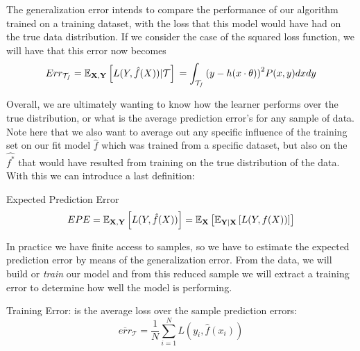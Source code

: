 The generalization error intends to compare the performance of our algorithm trained on a training dataset, with the loss that this model would have had on the true data distribution.
If we consider the case of the squared loss function, we will have that this error now becomes
\begin{equation}
	Err_{\mathcal{T_s}} = \operatorname{\mathbb{E}}_{\textbf{X},\textbf{Y}} \left[ L(Y,\hat{f}(X)) | \mathcal{T}\right] \\
	= \int_{\mathcal{T_s}} {(y - h(x \cdot \theta) )}^2 P(x,y)dxdy
	\label{eq:squaredGeneralizationError}
\end{equation}


Overall, we are ultimately wanting to know how the learner performs over the true distribution, or what is the average prediction error's for any sample of data.
Note here that we also want to average out any specific influence of the training set on our fit model $\hat{f}$ which was trained from a specific dataset, but also on the $\hat{f^*}$ that would have resulted from training on the true distribution of the data.
With this we can introduce a last definition:
\begin{definition}{Expected Prediction Error}
\begin{equation}
	 EPE = \operatorname{\mathbb{E}}_{\textbf{X},\textbf{Y}} \left[ L(Y,\hat{f}(X))\right] = \operatorname{\mathbb{E}}_{\textbf{X}} \left[  \operatorname{\mathbb{E}}_{{\textbf{Y}} | \textbf{X}} \left[   L(Y,f(X)) 	\right]  \right]
	\end{equation}
\end{definition}


In practice we have finite access to samples, so we have to estimate the expected prediction error by means of the generalization error.
From the data, we will build or \textit{train} our model and from this reduced sample we will extract a training error to determine how well the model is performing.


\begin{definition}{Training Error:}
	is the average loss over the sample prediction errors:
	$$ \overline{err}_{\mathcal{T}} = \frac{1}{N} \sum_{i=1}^N L(y_i, \hat{f}(x_i) )$$
\end{definition}\label{def:trainingError}

